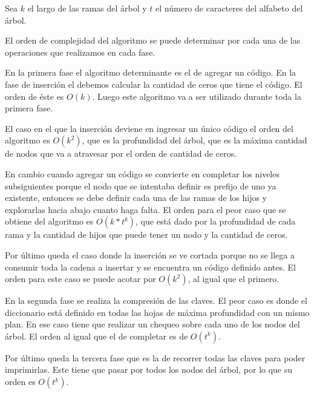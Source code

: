 Sea $k$ el largo de las ramas del árbol y $t$ el número de caracteres del alfabeto del árbol.

El orden de complejidad del algoritmo se puede determinar por cada una de las
operaciones que realizamos en cada fase. 

En la primera fase el algoritmo determinante es el de agregar un código. En la
fase de inserción el debemos calcular la cantidad de ceros que tiene el
código. El orden de éste es $O(k)$. Luego este algoritmo va a ser utilizado
durante toda la primera fase.

El caso en el que la inserción deviene en ingresar un único código el
orden del algoritmo es $O(k^2)$, que es la profundidad del árbol, que es la
máxima cantidad de nodos que va a atravesar por el orden de cantidad de ceros.

En cambio cuando agregar un código se convierte en completar los niveles
subsiguientes porque el nodo que se intentaba definir es prefijo de uno ya
existente, entonces se debe definir cada una de las ramas de los hijos y
explorarlas hacia abajo cuanto haga falta. El orden para el peor caso que se
obtiene del algoritmo es $O(k*t^k)$, que está dado por la profundidad de cada
rama y la cantidad de hijos que puede tener un nodo y la cantidad de ceros.

Por último queda el caso donde la inserción se ve cortada porque no
se llega a consumir toda la cadena a insertar y se encuentra un código
definido antes. El orden para este caso se puede acotar por $O(k^2)$, al igual
que el primero.

En la segunda fase se realiza la compresión de las claves. El peor caso es
donde el diccionario está definido en todas las hojas de máxima profundidad
con un mismo plan. En ese caso tiene que realizar un chequeo sobre cada uno
de los nodos del árbol. El orden al igual que el de completar es de $O(t^k)$.

Por último queda la tercera fase que es la de recorrer todas las claves para
poder imprimirlas. Este tiene que pasar por todos los nodos del árbol, por lo
que su orden es $O(t^k)$.
